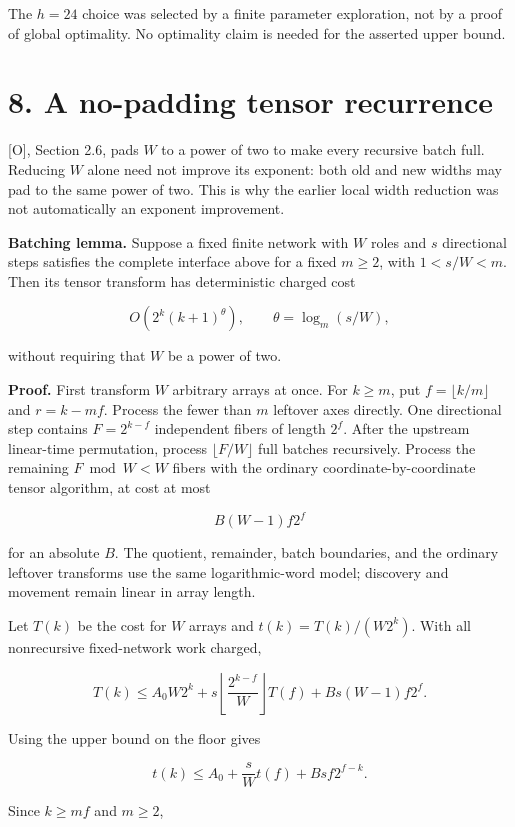 \documentclass[
  11pt,
  letterpaper,
]{article}
\begin{document}
The \(h=24\) choice was selected by a finite parameter exploration, not
by a proof of global optimality. No optimality claim is needed for the
asserted upper bound.

\section{8. A no-padding tensor
recurrence}\label{a-no-padding-tensor-recurrence}

{[}O{]}, Section 2.6, pads \(W\) to a power of two to make every
recursive batch full. Reducing \(W\) alone need not improve its
exponent: both old and new widths may pad to the same power of two. This
is why the earlier local width reduction was not automatically an
exponent improvement.

\textbf{Batching lemma.} Suppose a fixed finite network with \(W\) roles
and \(s\) directional steps satisfies the complete interface above for a
fixed \(m\ge2\), with \(1<s/W<m\). Then its tensor transform has
deterministic charged cost

\[
O\!\left(2^k(k+1)^\theta\right),\qquad \theta=\log_m(s/W),
\]

without requiring that \(W\) be a power of two.

\textbf{Proof.} First transform \(W\) arbitrary arrays at once. For
\(k\ge m\), put \(f=\lfloor k/m\rfloor\) and \(r=k-mf\). Process the
fewer than \(m\) leftover axes directly. One directional step contains
\(F=2^{k-f}\) independent fibers of length \(2^f\). After the upstream
linear-time permutation, process \(\lfloor F/W\rfloor\) full batches
recursively. Process the remaining \(F\bmod W<W\) fibers with the
ordinary coordinate-by-coordinate tensor algorithm, at cost at most

\[
B(W-1)f2^f
\]

for an absolute \(B\). The quotient, remainder, batch boundaries, and
the ordinary leftover transforms use the same logarithmic-word model;
discovery and movement remain linear in array length.

Let \(T(k)\) be the cost for \(W\) arrays and \(t(k)=T(k)/(W2^k)\). With
all nonrecursive fixed-network work charged,

\[
T(k)\le A_0W2^k+s\left\lfloor\frac{2^{k-f}}W\right\rfloor T(f)
+B s(W-1)f2^f.
\]

Using the upper bound on the floor gives

\[
t(k)\le A_0+\frac{s}{W}t(f)+B s f2^{f-k}.
\]

Since \(k\ge mf\) and \(m\ge2\),
\end{document}
